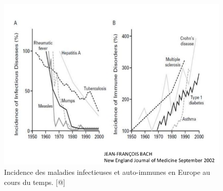 \documentclass[12pt,a4paper]{article}
\begin{document}
\begin{figure}[ht]
\begin{center}
\includegraphics[scale=0.5]{img/allergie_infection.jpg}\hfill
\end{center}
\caption{Incidence des maladies infectieuses et auto-immunes en Europe au cours du temps. [@]}
\label{hyigienisme}
\end{figure}
\end{document}
